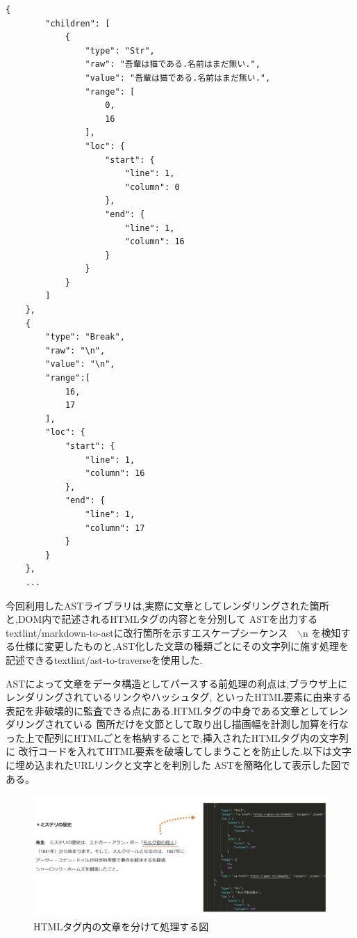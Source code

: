 \begin{lstlisting}[caption=textToAST.json]
    {
        "children": [
            {
                "type": "Str",
                "raw": "吾輩は猫である.名前はまだ無い.",
                "value": "吾輩は猫である.名前はまだ無い.",
                "range": [
                    0,
                    16
                ],
                "loc": {
                    "start": {
                        "line": 1,
                        "column": 0
                    },
                    "end": {
                        "line": 1,
                        "column": 16
                    }
                }
            }
        ]
    },
    {
        "type": "Break",
        "raw": "\n",
        "value": "\n",
        "range":[
            16,
            17
        ],
        "loc": {
            "start": {
                "line": 1,
                "column": 16
            },
            "end": {
                "line": 1,
                "column": 17
            }
        }
    },
    ...
\end{lstlisting}

今回利用したASTライブラリは,実際に文章としてレンダリングされた箇所と,DOM内で記述されるHTMLタグの内容とを分別して
ASTを出力するtextlint/markdown-to-astに改行箇所を示すエスケープシーケンス　$\backslash$n
を検知する仕様に変更したものと\footnotemark[4],AST化した文章の種類ごとにその文字列に施す処理を記述できるtextlint/ast-to-traverseを使用した.\footnotemark[5]

ASTによって文章をデータ構造としてパースする前処理の利点は,ブラウザ上にレンダリングされているリンクやハッシュタグ,
といったHTML要素に由来する表記を非破壊的に監査できる点にある.HTMLタグの中身である文章としてレンダリングされている
箇所だけを文節として取り出し描画幅を計測し加算を行なった上で配列にHTMLごとを格納することで,挿入されたHTMLタグ内の文字列に
改行コードを入れてHTML要素を破壊してしまうことを防止した.以下は文字に埋め込まれたURLリンクと文字とを判別した
ASTを簡略化して表示した図である。

\begin{figure}[H]
    \centering
    \label{fig:image16}
    \includegraphics[width=0.7\columnwidth]{image/03/img7.png}
	\caption[HTMLタグ内の文章を分けて処理する図]{HTMLタグ内の文章を分けて処理する図} \footnotemark[6]
\end{figure}

